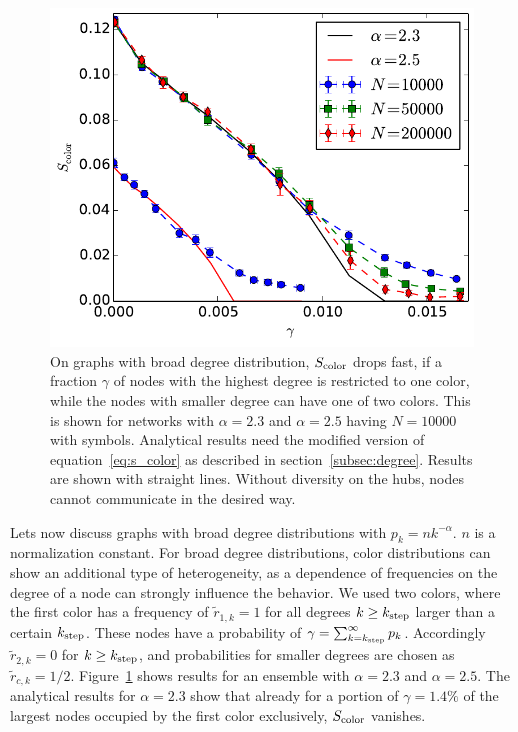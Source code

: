 \documentclass[aps, pre, twocolumn, a4paper, floatfix]{revtex4}
\begin{document}
{\begin{figure}[htb]
\begin{center}
    \includegraphics[width=1.0\columnwidth]{S_color_degree_dependent_broad.pdf}
    \caption{On graphs with broad degree distribution, $S_{\rm color}$ drops fast, 
    if a fraction $\gamma$ of nodes with the highest 
    degree is restricted to one color, while the nodes with smaller degree can have one of 
    two colors. This is shown for networks with $\alpha=2.3$ and $\alpha=2.5$ having $N=10000$ 
    with symbols. Analytical results need the modified version of equation~\ref{eq:s_color} 
    as described in section~\ref{subsec:degree}. Results are shown with straight lines. Without diversity 
    on the hubs, nodes cannot communicate in the desired way.}
    \label{fig:degree}
\end{center}
\end{figure}

Lets now discuss graphs with broad degree distributions with 
$p_k=n k^{-\alpha}$. $n$ is a normalization constant. 
For broad degree distributions, color distributions can show an additional type of 
heterogeneity, as a dependence of frequencies on the degree of a node can strongly 
influence the behavior. We used two colors, where the first color has a frequency 
of ${\tilde r}_{1,k}=1$ for all degrees $k\geq k_{\rm step}$ larger than a certain 
$k_{\rm step}$. These nodes have a probability of 
$\gamma=\sum_{k=k_{\rm step}}^{\infty} p_k$. Accordingly 
${\tilde r}_{2,k}=0$ for $k\geq k_{\rm step}$, and probabilities for smaller degrees are chosen as 
${\tilde r}_{c,k}=1/2$. Figure~\ref{fig:degree} shows results for an ensemble with 
$\alpha=2.3$ and $\alpha=2.5$. The analytical results for $\alpha=2.3$ show that already for a portion 
of $\gamma=1.4\%$ of the largest nodes occupied by the first color exclusively, $S_{\rm color}$ vanishes. 





}
\end{document}
